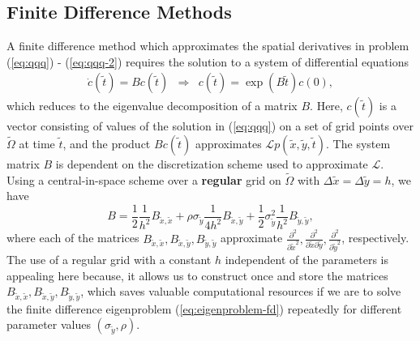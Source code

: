 \subsection{Finite Difference Methods} \label{sec:finite-difference} A finite
difference method which approximates the spatial derivatives in
problem (\ref{eq:qqq}) - (\ref{eq:qqq-2}) requires the solution to a
system of differential equations
\begin{align}
  \dot{c}(\tilde{t})= B c(\tilde{t}) &\Rightarrow& c(\tilde{t}) = \exp\left( B\tilde{t} \right)c(0) \label{eq:eigenproblem-fd},
\end{align}
which reduces to the eigenvalue decomposition of a matrix $B$. Here,
$c(\tilde{t})$ is a vector consisting of values of the solution in
(\ref{eq:qqq}) on a set of grid points over $\tilde{\Omega}$ at time
$\tilde{t}$, and the product $Bc(\tilde{t})$ approximates
$\mathcal{L}p(\tilde{x},\tilde{y},\tilde{t})$. The system matrix $B$
is dependent on the discretization scheme used to approximate
$\mathcal{L}$. Using a central-in-space scheme over a \textbf{regular}
grid on $\tilde{\Omega}$ with
$\Delta \tilde{x} = \Delta \tilde{y} = h$, we have
\[ B = \frac{1}{2} \frac{1}{h^2}B_{\tilde{x},\tilde{x}} +
  \rho\sigma_{\tilde{y}} \frac{1}{4h^2}B_{\tilde{x},\tilde{y}} + \frac{1}{2}\sigma_{\tilde{y}}^2
  \frac{1}{h^2}B_{\tilde{y},\tilde{y}},
\]
where each of the matrices
$B_{\tilde{x},\tilde{x}}, B_{\tilde{x},\tilde{y}},
B_{\tilde{y},\tilde{y}}$ approximate
$\frac{\partial^2}{\partial \tilde{x}^2}, \frac{\partial^2}{\partial
  \tilde{x} \partial \tilde{y}}, \frac{\partial^2}{\partial
  \tilde{y}^2}$, respectively.
The use of a regular grid with a constant $h$ independent of the
parameters is appealing here because, it allows us to construct once
and store the matrices
$B_{\tilde{x},\tilde{x}}, B_{\tilde{x},\tilde{y}},
B_{\tilde{y},\tilde{y}}$, which saves valuable computational resources
if we are to solve the finite difference eigenproblem
(\ref{eq:eigenproblem-fd}) repeatedly for different parameter values
$(\sigma_{\tilde{y}},\rho)$.

